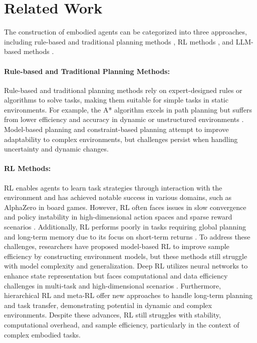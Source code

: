 \section{Related Work}
\label{sec:relate_work} The construction of embodied agents can be categorized into three approaches, including rule-based and traditional planning methods \cite{blake2001rule}, RL methods \cite{russell2003q}, and LLM-based methods \cite{zhao2024expel}. 
\vspace{-1em}
\paragraph{Rule-based and Traditional Planning Methods:} Rule-based and traditional planning methods rely on expert-designed rules or algorithms to solve tasks, making them suitable for simple tasks in static environments. For example, the A* algorithm \cite{liu2011comparative} excels in path planning but suffers from lower efficiency and accuracy in dynamic or unstructured environments \cite{mohanan2018survey}. Model-based planning \cite{ghallab2004automated} and constraint-based planning \cite{baptiste2006constraint} attempt to improve adaptability to complex environments, but challenges persist when handling uncertainty and dynamic changes.
\vspace{-1em}
\paragraph{RL Methods:} RL enables agents to learn task strategies through interaction with the environment and has achieved notable success in various domains, such as AlphaZero \cite{silver2018general} in board games. However, RL often faces issues in slow convergence and policy instability in high-dimensional action spaces and sparse reward scenarios \cite{vecerik2017leveraging, horgan2018distributed}. Additionally, RL performs poorly in tasks requiring global planning and long-term memory due to its focus on short-term returns \cite{nguyen2020deep, rusu2016progressive}. To address these challenges, researchers have proposed model-based RL \cite{kaiser2019model, moerland2023model} to improve sample efficiency by constructing environment models, but these methods still struggle with model complexity and generalization. Deep RL \cite{mnih2015human} utilizes neural networks to enhance state representation but faces computational and data efficiency challenges in multi-task and high-dimensional scenarios \cite{li2019deep, zhu2021overview}. Furthermore, hierarchical RL \cite{pateria2021hierarchical} and meta-RL \cite{beck2023survey, finn2017model} offer new approaches to handle long-term planning and task transfer, demonstrating potential in dynamic and complex environments. Despite these advances, RL still struggles with stability, computational overhead, and sample efficiency, particularly in the context of complex embodied tasks.
\vspace{-1em}

